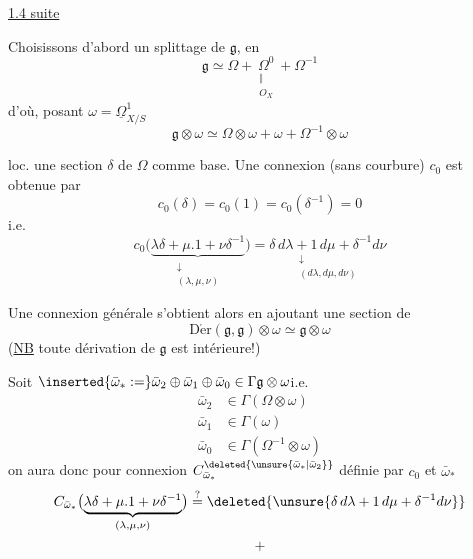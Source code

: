 \uline{1.4 suite}

Choisissons d'abord un splittage de 
$\mathfrak g$, en
\[
\mathfrak g\simeq\Omega+\underset{\substack{\Vert\\O_X}}{\Omega^0}+\Omega^{-1}
\]
d'où, posant $\omega=\underline\Omega^1_{X/S}$
\[
\mathfrak g\otimes\omega\simeq\Omega\otimes\omega+\omega+\Omega^{-1}\otimes\omega
\]
\par {} loc. une section $\delta$ de $\Omega$ comme
base. Une connexion (sans courbure)
$c_0$ est obtenue par
\[
c_0(\delta)=c_0(1)=c_0(\delta^{-1})=0
\]
i.e.
\[
c_0\bigl(\underset{\substack{\downarrow\\(\lambda,\mu,\nu)}}{\underbrace{\lambda\delta+\mu.1+\nu\delta^{-1}}}\bigr)
=\underset{\substack{\downarrow\\(d\lambda,d\mu,d\nu)}}{\delta\,d\lambda+1\,d\mu+\delta^{-1}d\nu}
\]

Une connexion générale s'obtient alors en
ajoutant une section de
\[
\operatorname{D\acute er}(\mathfrak g,\mathfrak g)\otimes\omega\simeq\mathfrak g\otimes\omega
\]
(\uline{NB} toute dérivation de $\mathfrak g$ est intérieure!)

Soit $\inserted{\bar\omega_*:=}\bar\omega_2\oplus\bar\omega_1\oplus\bar\omega_0
\in\Gamma\mathfrak g\otimes\omega$\quad i.e.
\[
\begin{aligned}
\bar\omega_2&\in\Gamma(\Omega\otimes\omega)\\
\bar\omega_1&\in\Gamma(\omega)\\
\bar\omega_0&\in\Gamma(\Omega^{-1}\otimes\omega)
\end{aligned}
\]
on aura donc pour connexion $C^{\deleted{\unsure{\bar\omega_*|\bar\omega_2}}}_{\bar\omega_*}$
définie par $c_0$ et $\bar\omega_*$
\[
C_{\bar\omega_*}\bigl(\underbrace{\lambda\delta+\mu.1+\nu\delta^{-1}}_{(\lambda,\mu,\nu)}\bigr)
\overset{?}{=}\deleted{\unsure{\delta\,d\lambda+1\,d\mu+\delta^{-1}d\nu}}
\]
\[
+
\]

